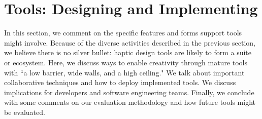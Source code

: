 %
%
%






\section{\haxd Tools: Designing and Implementing}
In this section, we comment on the specific features and forms \haxd support tools might involve.
Because of the diverse activities described in the previous section, we believe there is no silver bullet: haptic design tools are likely to form a suite or ecosystem.
Here, we discuss ways to enable creativity through mature tools with ``a low barrier, wide walls, and a high ceiling."
We talk about important collaborative techniques and how to deploy implemented tools.
We discuss implications for developers and software engineering teams.
Finally, we conclude with some comments on our evaluation methodology and how future \haxd tools might be evaluated.


